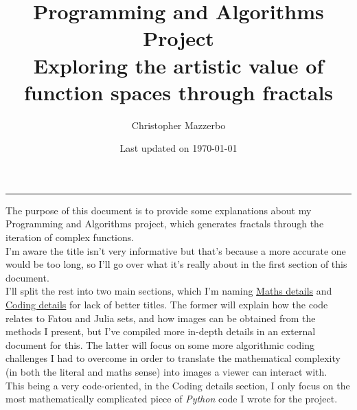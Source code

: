 \documentclass{article}
\title{Programming and Algorithms Project \\ Exploring the artistic value of function spaces through fractals}
\author{Christopher Mazzerbo}
\date{Last updated on \today}
\begin{document}


\titlespacing{\subsubsection}{5mm}{0cm}{0cm}


\pagestyle{plain}
\maketitle
\vspace{5mm}
\hrule
\pagebreak


\pagestyle{fancy}
\fancyhf{}
\fancyhfoffset[L]{1cm} %
\fancyhfoffset[R]{1cm} %
\fancyfoot{}
\fancyfoot[C]{\thepage}

\tableofcontents
\pagebreak


The purpose of this document is to provide some explanations about my Programming and Algorithms project, which generates fractals through the iteration of complex functions. \\
\vspace{5mm}
I'm aware the title isn't very informative but that's because a more accurate one would be too long, so I'll go over what it's really about in the first section of this document. \\
\vspace{2mm}
I'll split the rest into two main sections, which I'm naming \underline{Maths details} and \underline{Coding details} for lack of better titles. The former will explain how the code relates to Fatou and Julia sets, and how images can be obtained from the methods I present, but I've compiled more in-depth details in an external document for this. The latter will focus on some more algorithmic coding challenges I had to overcome in order to translate the mathematical complexity (in both the literal and maths sense) into images a viewer can interact with. \\
\vspace{5mm}
This being a very code-oriented, in the Coding details section, I only focus on the most mathematically complicated piece of \textit{Python} code I wrote for the project. \\
\vspace{5mm}
\end{document}

